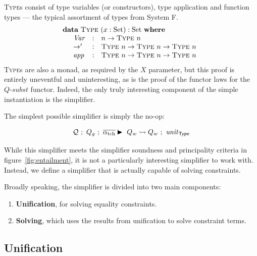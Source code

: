 \documentclass[a4paper]{jfp}
\begin{document}
\textsc{Type}s consist of type variables (or constructors), type application and function types --- the typical assortment of types from System F.
\begin{displaymath}
   \begin{array}{l}
      \textbf{data}\ \textsc{Type}\ (x : \text{Set}) : \text{Set}\ \textbf{where} \\
      \quad \begin{array}{lll}
        \mathit{Var} & : &  n \rightarrow \textsc{Type}\ n \\
        \rightarrow' & : &  \textsc{Type}\ n \rightarrow \textsc{Type}\ n \rightarrow \textsc{Type}\ n \\
        \mathit{app} & : &  \textsc{Type}\ n \rightarrow \textsc{Type}\ n \rightarrow \textsc{Type}\ n \\
         \end{array}
   \end{array}
\end{displaymath}
\textsc{Type}s are also a monad, as required by the $X$ parameter, but this proof is entirely uneventful and uninteresting, as is the proof of the
functor laws for the $\textit{Q-subst}$ functor. Indeed, the only truly interesting component of the simple instantiation is the simplifier.

The simplest possible simplifier is simply the no-op:

\begin{displaymath}
   \mathcal{Q}\ ;\ Q_g\ ;\ \overline{\alpha_\text{tch}} \vdasharrow Q_w \leadsto Q_w\ ;\ \mathit{unit}_\textsf{Type}
\end{displaymath}

While this simplifier meets the simplifier soundness and principality criteria in figure~\ref{fig:entailment}, it is not a particularly interesting
simplifier to work with. Instead, we define a simplifier that is actually capable of solving constraints. 

Broadly speaking, the simplifier is divided into two main components:

\begin{enumerate}
      \item \textbf{Unification}, for solving equality constraints. 
      \item \textbf{Solving}, which uses the results from unification to solve constraint terms.
\end{enumerate}

\subsection{Unification}
\end{document}
